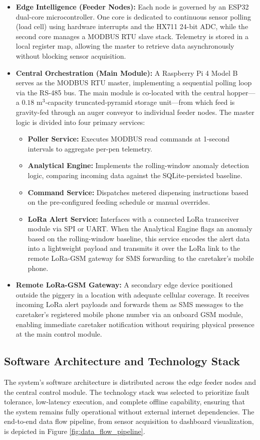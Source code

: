 \begin{itemize}
  \item \textbf{Edge Intelligence (Feeder Nodes):} Each node is governed by an ESP32 dual-core microcontroller. One core is dedicated to continuous sensor polling (load cell) using hardware interrupts and the HX711 24-bit ADC, while the second core manages a MODBUS RTU slave stack. Telemetry is stored in a local register map, allowing the master to retrieve data asynchronously without blocking sensor acquisition.
  \item \textbf{Central Orchestration (Main Module):} A Raspberry Pi 4 Model B serves as the MODBUS RTU master, implementing a sequential polling loop via the RS-485 bus. The main module is co-located with the central hopper---a $0.18\text{ m}^3$-capacity truncated-pyramid storage unit---from which feed is gravity-fed through an auger conveyor to individual feeder nodes. The master logic is divided into four primary services:
    \begin{itemize}
      \item \textbf{Poller Service:} Executes MODBUS read commands at 1-second intervals to aggregate per-pen telemetry.
      \item \textbf{Analytical Engine:} Implements the rolling-window anomaly detection logic, comparing incoming data against the SQLite-persisted baseline.
      \item \textbf{Command Service:} Dispatches metered dispensing instructions based on the pre-configured feeding schedule or manual overrides.
      \item \textbf{LoRa Alert Service:} Interfaces with a connected LoRa transceiver module via SPI or UART. When the Analytical Engine flags an anomaly based on the rolling-window baseline, this service encodes the alert data into a lightweight payload and transmits it over the LoRa link to the remote LoRa-GSM gateway for SMS forwarding to the caretaker's mobile phone.
    \end{itemize}
  \item \textbf{Remote LoRa-GSM Gateway:} A secondary edge device positioned outside the piggery in a location with adequate cellular coverage. It receives incoming LoRa alert payloads and forwards them as SMS messages to the caretaker's registered mobile phone number via an onboard GSM module, enabling immediate caretaker notification without requiring physical presence at the main control module.
\end{itemize}

\subsection{Software Architecture and Technology Stack}
The system's software architecture is distributed across the edge feeder nodes and the central control module. The technology stack was selected to prioritize fault tolerance, low-latency execution, and complete offline capability, ensuring that the system remains fully operational without external internet dependencies. The end-to-end data flow pipeline, from sensor acquisition to dashboard visualization, is depicted in Figure \ref{fig:data_flow_pipeline}.

